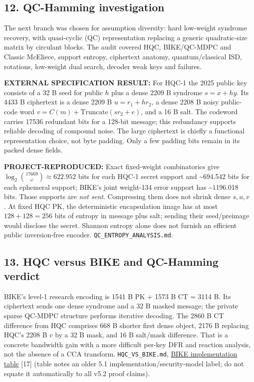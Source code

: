 \documentclass[
  10pt,
  a4paper,
]{article}
\begin{document}
\hypertarget{qc-hamming-investigation}{%
\subsection{12. QC-Hamming
investigation}\label{qc-hamming-investigation}}

The next branch was chosen for assumption diversity: hard low-weight
syndrome recovery, with quasi-cyclic (QC) representation replacing a
generic quadratic-size matrix by circulant blocks. The audit covered
HQC, BIKE/QC-MDPC and Classic McEliece, support entropy, ciphertext
anatomy, quantum/classical ISD, rotations, low-weight dual search,
decoder weak keys and failures.

\textbf{EXTERNAL SPECIFICATION RESULT:} For HQC-1 the 2025 public key
consists of a 32 B seed for public \(h\) plus a dense 2209 B syndrome
\(s=x+h y\). Its 4433 B ciphertext is a dense 2209 B \(u=r_1+h r_2\), a
dense 2208 B noisy public-code word
\(v=C(m)+\mathrm{Truncate}(s r_2+e)\), and a 16 B salt. The codeword
carries 17536 redundant bits for a 128-bit message; this redundancy
supports reliable decoding of compound noise. The large ciphertext is
chiefly a functional representation choice, not byte padding. Only a few
padding bits remain in its packed dense fields.

\textbf{PROJECT-REPRODUCED:} Exact fixed-weight combinatorics give
\(\log_2\binom{17669}{\omega}\approx622.952\) bits for each HQC-1 secret
support and \textasciitilde694.542 bits for each ephemeral support;
BIKE's joint weight-134 error support has \textasciitilde1196.018 bits.
Those supports are \emph{not sent}. Compressing them does not shrink
dense \(s,u,v\). At fixed HQC PK, the deterministic encapsulation image
has at most \(128+128=256\) bits of entropy in message plus salt;
sending their seed/preimage would disclose the secret. Shannon entropy
alone does not furnish an efficient public inversion-free encoder.
\texttt{QC\_ENTROPY\_ANALYSIS.md}.

\hypertarget{hqc-versus-bike-and-qc-hamming-verdict}{%
\subsection{13. HQC versus BIKE and QC-Hamming
verdict}\label{hqc-versus-bike-and-qc-hamming-verdict}}

BIKE's level-1 research encoding is 1541 B PK + 1573 B CT = 3114 B. Its
ciphertext sends one dense syndrome and a 32 B masked message; the
private sparse QC-MDPC structure performs iterative decoding. The 2860 B
CT difference from HQC comprises 668 B shorter first dense object, 2176
B replacing HQC's 2208 B \(v\) by a 32 B mask, and 16 B salt/mask
difference. That is a concrete bandwidth gain with a more difficult
per-key DFR and reaction analysis, not the absence of a CCA transform.
\texttt{HQC\_VS\_BIKE.md},
\href{https://openquantumsafe.org/liboqs/algorithms/kem/bike.html}{BIKE
implementation table} {[}17{]} (table notes an older 5.1
implementation/security-model label; do not equate it automatically to
all v5.2 proof claims).
\end{document}
